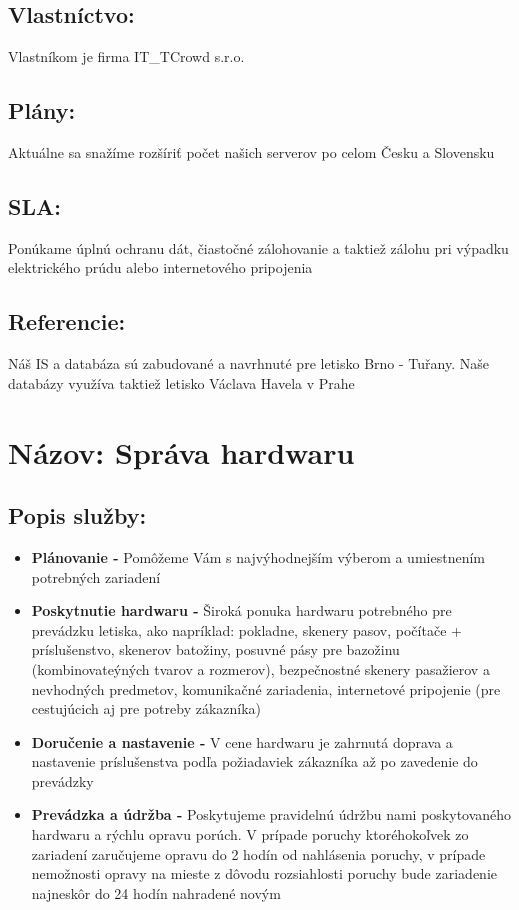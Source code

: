 \documentclass[a4paper, 11pt]{article}
\begin{document}
\subsection*{Vlastníctvo:}
Vlastníkom je firma IT\_TCrowd s.r.o.
\subsection*{Plány:}
Aktuálne sa snažíme rozšíriť počet našich serverov po celom Česku a Slovensku
\subsection*{SLA:}
Ponúkame úplnú ochranu dát, čiastočné zálohovanie a taktiež zálohu pri výpadku elektrického prúdu alebo internetového pripojenia
\subsection*{Referencie:}
Náš IS a databáza sú zabudované a navrhnuté pre letisko Brno - Tuřany. Naše databázy využíva taktiež letisko Václava Havela v Prahe

\section*{Názov: Správa hardwaru}
\subsection*{Popis služby:}
\begin{itemize}
\item \textbf{Plánovanie - } Pomôžeme Vám s najvýhodnejším výberom a umiestnením potrebných zariadení
\item \textbf{Poskytnutie hardwaru -} Široká ponuka hardwaru potrebného pre prevádzku letiska, ako napríklad: pokladne, skenery pasov, počítače + príslušenstvo, skenerov batožiny, posuvné pásy pre bazožinu (kombinovateýných tvarov a rozmerov), bezpečnostné skenery pasažierov a nevhodných predmetov, komunikačné zariadenia, internetové pripojenie (pre cestujúcich aj pre potreby zákazníka)
\item \textbf{Doručenie a nastavenie -} V cene hardwaru je zahrnutá doprava a nastavenie príslušenstva podľa požiadaviek zákazníka až po zavedenie do prevádzky
\item \textbf{Prevádzka a údržba -} Poskytujeme pravidelnú údržbu nami poskytovaného hardwaru a rýchlu opravu porúch. V prípade poruchy ktoréhokoľvek zo zariadení zaručujeme opravu do 2 hodín od nahlásenia poruchy, v prípade nemožnosti opravy na mieste z dôvodu rozsiahlosti poruchy bude zariadenie najneskôr do 24 hodín nahradené novým
\end{itemize}
\end{document}
